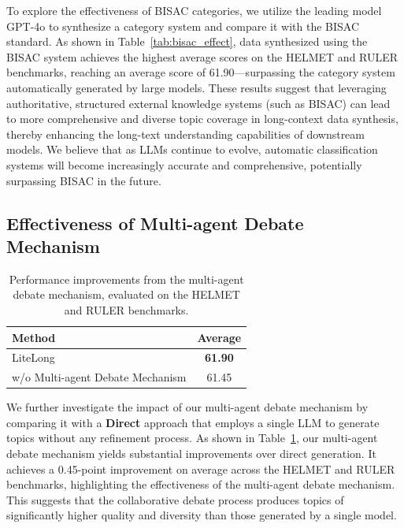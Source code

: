 \documentclass{article}
\theoremstyle{plain}
\theoremstyle{definition}
\theoremstyle{remark}
\begin{document}
    To explore the effectiveness of BISAC categories, we utilize the leading model GPT-4o to synthesize a category system and compare it with the BISAC standard. As shown in Table~\ref{tab:bisac_effect}, data synthesized using the BISAC system achieves the highest average scores on the HELMET \cite{yen2025helmet} and RULER \cite{hsieh2024ruler} benchmarks, reaching an average score of 61.90—surpassing the category system automatically generated by large models. These results suggest that leveraging authoritative, structured external knowledge systems (such as BISAC) can lead to more comprehensive and diverse topic coverage in long-context data synthesis, thereby enhancing the long-text understanding capabilities of downstream models. We believe that as LLMs continue to evolve, automatic classification systems will become increasingly accurate and comprehensive, potentially surpassing BISAC in the future.

\subsection{Effectiveness of Multi-agent Debate Mechanism}

    \begin{table}[!tbp]
        \centering
        \small
        \begin{tabular}{lc}
        \toprule
        \textbf{Method} & \textbf{Average} \\
        \midrule
        LiteLong & \textbf{61.90} \\
        w/o Multi-agent Debate Mechanism & 61.45 \\
        \bottomrule
        \end{tabular}
        \caption{Performance improvements from the multi-agent debate mechanism, evaluated on the HELMET and RULER benchmarks.}
        \label{tab:multi_debate_effect}
    \end{table}

    We further investigate the impact of our multi-agent debate mechanism by comparing it with a \textbf{Direct} approach that employs a single LLM to generate topics without any refinement process. As shown in Table~\ref{tab:multi_debate_effect}, our multi-agent debate mechanism yields substantial improvements over direct generation. It achieves a 0.45-point improvement on average across the HELMET \cite{yen2025helmet} and RULER \cite{hsieh2024ruler} benchmarks, highlighting the effectiveness of the multi-agent debate mechanism. This suggests that the collaborative debate process produces topics of significantly higher quality and diversity than those generated by a single model.
\end{document}
